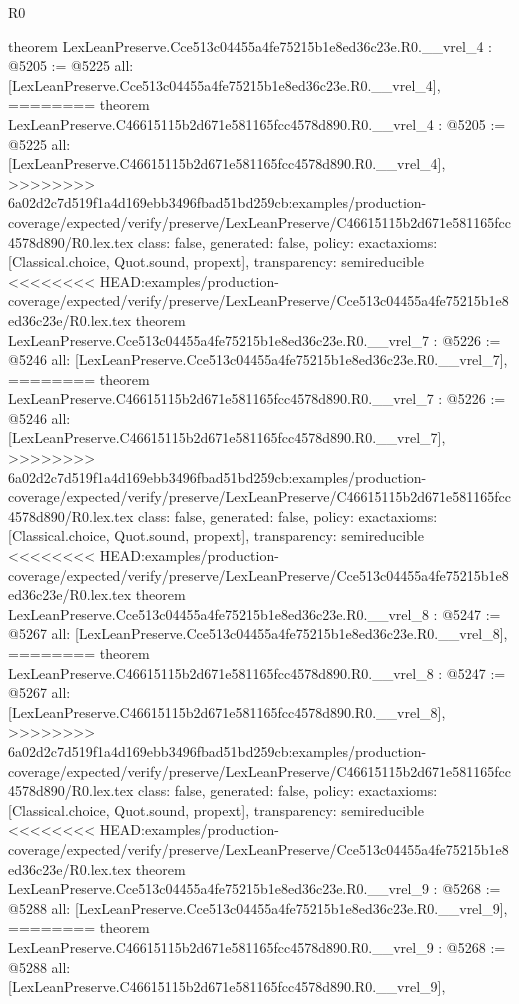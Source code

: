 \begin{lexlean}{R0}
\begin{coremodule}
{{{{{{{{{{{{{{{{{{{{{{{{{{{{{{{{{{{{{{{{{{{{{{{{{{{{{{{{{{{{{{{{{{{{theorem LexLeanPreserve.Cce513c04455a4fe75215b1e8ed36c23e.R0.__vrel_4 : @5205 := @5225 {
  all: [LexLeanPreserve.Cce513c04455a4fe75215b1e8ed36c23e.R0.__vrel_4],
========
theorem LexLeanPreserve.C46615115b2d671e581165fcc4578d890.R0.__vrel_4 : @5205 := @5225 {
  all: [LexLeanPreserve.C46615115b2d671e581165fcc4578d890.R0.__vrel_4],
>>>>>>>> 6a02d2c7d519f1a4d169ebb3496fbad51bd259cb:examples/production-coverage/expected/verify/preserve/LexLeanPreserve/C46615115b2d671e581165fcc4578d890/R0.lex.tex
  class: false,
  generated: false,
  policy: exact{axioms: [Classical.choice, Quot.sound, propext]},
  transparency: semireducible
}
<<<<<<<< HEAD:examples/production-coverage/expected/verify/preserve/LexLeanPreserve/Cce513c04455a4fe75215b1e8ed36c23e/R0.lex.tex
theorem LexLeanPreserve.Cce513c04455a4fe75215b1e8ed36c23e.R0.__vrel_7 : @5226 := @5246 {
  all: [LexLeanPreserve.Cce513c04455a4fe75215b1e8ed36c23e.R0.__vrel_7],
========
theorem LexLeanPreserve.C46615115b2d671e581165fcc4578d890.R0.__vrel_7 : @5226 := @5246 {
  all: [LexLeanPreserve.C46615115b2d671e581165fcc4578d890.R0.__vrel_7],
>>>>>>>> 6a02d2c7d519f1a4d169ebb3496fbad51bd259cb:examples/production-coverage/expected/verify/preserve/LexLeanPreserve/C46615115b2d671e581165fcc4578d890/R0.lex.tex
  class: false,
  generated: false,
  policy: exact{axioms: [Classical.choice, Quot.sound, propext]},
  transparency: semireducible
}
<<<<<<<< HEAD:examples/production-coverage/expected/verify/preserve/LexLeanPreserve/Cce513c04455a4fe75215b1e8ed36c23e/R0.lex.tex
theorem LexLeanPreserve.Cce513c04455a4fe75215b1e8ed36c23e.R0.__vrel_8 : @5247 := @5267 {
  all: [LexLeanPreserve.Cce513c04455a4fe75215b1e8ed36c23e.R0.__vrel_8],
========
theorem LexLeanPreserve.C46615115b2d671e581165fcc4578d890.R0.__vrel_8 : @5247 := @5267 {
  all: [LexLeanPreserve.C46615115b2d671e581165fcc4578d890.R0.__vrel_8],
>>>>>>>> 6a02d2c7d519f1a4d169ebb3496fbad51bd259cb:examples/production-coverage/expected/verify/preserve/LexLeanPreserve/C46615115b2d671e581165fcc4578d890/R0.lex.tex
  class: false,
  generated: false,
  policy: exact{axioms: [Classical.choice, Quot.sound, propext]},
  transparency: semireducible
}
<<<<<<<< HEAD:examples/production-coverage/expected/verify/preserve/LexLeanPreserve/Cce513c04455a4fe75215b1e8ed36c23e/R0.lex.tex
theorem LexLeanPreserve.Cce513c04455a4fe75215b1e8ed36c23e.R0.__vrel_9 : @5268 := @5288 {
  all: [LexLeanPreserve.Cce513c04455a4fe75215b1e8ed36c23e.R0.__vrel_9],
========
theorem LexLeanPreserve.C46615115b2d671e581165fcc4578d890.R0.__vrel_9 : @5268 := @5288 {
  all: [LexLeanPreserve.C46615115b2d671e581165fcc4578d890.R0.__vrel_9],
}}}}}}}}}}}}}}}}}}}}}}}}}}}}}}}}}}}}}}}}}}}}}}}}}}}}}}}}}}}}}}}}}}}}}}}}}
\end{coremodule}
\end{lexlean}
